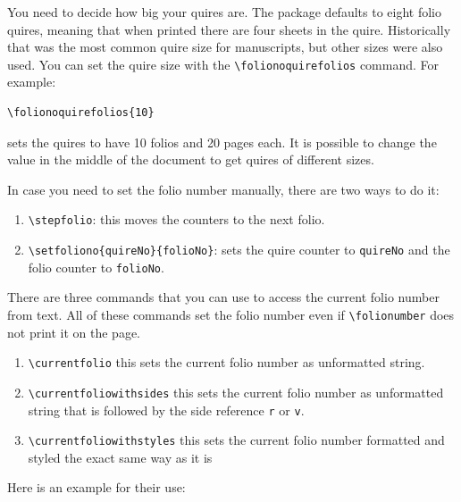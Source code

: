 \documentclass[a4paper, 12pt]{article}
\newcommand{\feature}[1]{\texttt{#1}}
\newcommand{\command}[1]{\texttt{\textbackslash{}#1}}
\newcommand{\commandtwo}[3]{\texttt{\textbackslash{}#1\{#2\}\{#3\}}}
\newcommand{\argument}[1]{\texttt{#1}}
\begin{document}
You need to decide how big your quires are. The package defaults to
eight folio quires, meaning that when printed there are four sheets in
the quire. Historically that was the most common quire size for
manuscripts, but other sizes were also used. You can set the quire
size with the \command{folionoquirefolios} command. For example:
\begin{verbatim}
\folionoquirefolios{10}
\end{verbatim}
sets the quires to have 10 folios and 20 pages each. It is possible to
change the value in the middle of the document to get quires of
different sizes. 

In case you need to set the folio number manually, there are two ways
to do it:

\begin{enumerate}
\item \command{stepfolio}: this moves the counters to the next folio.
\item \commandtwo{setfoliono}{quireNo}{folioNo}: sets the quire
  counter to \argument{quireNo} and the folio counter to
  \argument{folioNo}. 
\end{enumerate}

There are three commands that you can use to access the current folio
number from text. All of these commands set the folio number even if
\command{folionumber} does not print it on the page.
\begin{enumerate}
\item \command{currentfolio} this sets the current folio number as
  unformatted string. 

\item \command{currentfoliowithsides} this sets the current folio
  number as unformatted string that is followed by the side reference
  \feature{r} or \feature{v}. 

\item \command{currentfoliowithstyles} this sets the current folio
  number formatted and styled the exact same way as it is  

\end{enumerate}

Here is an example for their use:
\end{document}
